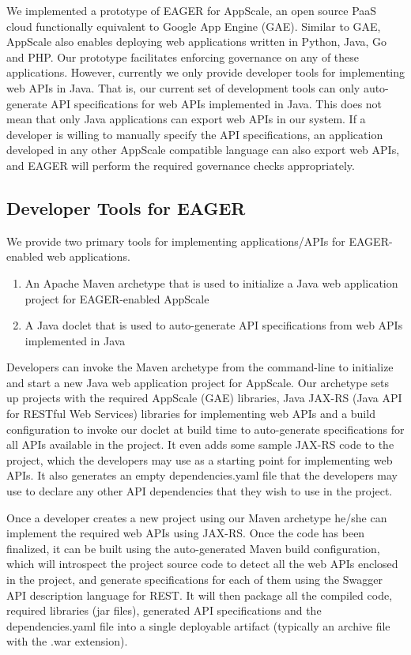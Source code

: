 We implemented a prototype of EAGER for AppScale, an open source PaaS cloud functionally equivalent to Google App Engine (GAE). Similar to
GAE, AppScale also enables deploying web applications written in Python, Java, Go and PHP. Our prototype facilitates enforcing governance on
any of these applications. However, currently we only provide developer tools for implementing web APIs in Java. That is, our current set of development
tools can only auto-generate API specifications for web APIs implemented in Java. This does not mean that only Java applications can export web
APIs in our system. If a developer is willing to manually specify the API specifications, an application developed in any other AppScale compatible
language can also export web APIs, and EAGER will perform the required governance checks appropriately.

\subsection{Developer Tools for EAGER}
We provide two primary tools for implementing applications/APIs for EAGER-enabled web applications.
\begin{enumerate}
\item An Apache Maven archetype that is used to initialize a Java web application project for EAGER-enabled AppScale
\item A Java doclet that is used to auto-generate API specifications from web APIs implemented in Java
\end{enumerate}

Developers can invoke the Maven archetype from the command-line to initialize and start a new Java web application project for AppScale. Our
archetype sets up projects with the required AppScale (GAE) libraries, Java JAX-RS (Java API for RESTful Web Services) libraries 
for implementing web APIs and a build configuration to
invoke our doclet at build time to auto-generate specifications for all APIs available in the project. It even adds some sample JAX-RS code to
the project, which the developers may use as a starting point for implementing web APIs. It also generates an empty dependencies.yaml file that the
developers may use to declare any other API dependencies that they wish to use in the project.

Once a developer creates a new project using our Maven archetype he/she can implement the required web APIs using JAX-RS. Once the code has 
been finalized, it can be built using the auto-generated Maven build configuration, which will introspect the project source code to detect all
the web APIs enclosed in the project, and generate specifications for each of them using the Swagger API description language for REST. It will
then package all the compiled code, required libraries (jar files), generated API specifications and the dependencies.yaml file into a single deployable
artifact (typically an archive file with the .war extension).

